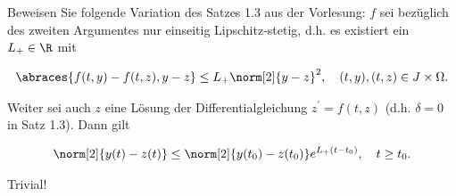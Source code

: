 \begin{exercise}

Beweisen Sie folgende Variation des Satzes 1.3 aus der Vorlesung:
$f$ sei bezüglich des zweiten Argumentes nur einseitig Lipschitz-stetig, d.h. es existiert ein $L_+ \in \R$ mit

\begin{align*}
  \abraces{f(t, y) - f(t, z), y - z}
  \leq
  L_+ \norm[2]{y - z}^2,
  \quad
  (t, y), (t, z) \in J \times \Omega.
\end{align*}

Weiter sei auch $z$ eine Lösung der Differentialgleichung $z^\prime = f(t, z)$ (d.h. $\delta = 0$ in Satz 1.3). Dann gilt

\begin{align*}
  \norm[2]{y(t) - z(t)}
  \leq
  \norm[2]{y(t_0) - z(t_0)} e^{L_+ (t - t_0)},
  \quad
  t \geq t_0.
\end{align*}

\end{exercise}

\begin{solution}

Trivial!

\end{solution}

